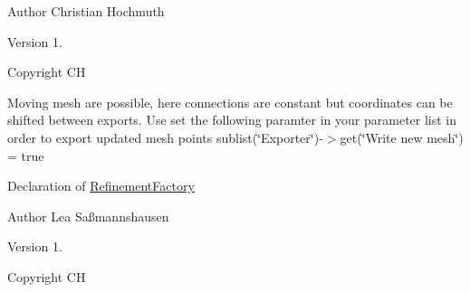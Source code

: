 \begin{DoxyAuthor}{Author}
Christian Hochmuth 
\end{DoxyAuthor}
\begin{DoxyVersion}{Version}
1. 
\end{DoxyVersion}
\begin{DoxyCopyright}{Copyright}
CH
\end{DoxyCopyright}
Moving mesh are possible, here connections are constant but coordinates can be shifted between exports. Use set the following paramter in your parameter list in order to export updated mesh points sublist(\char`\"{}\+Exporter\char`\"{})-\/$>$get(\char`\"{}\+Write new mesh\char`\"{}) = true

Declaration of \hyperlink{classFEDD_1_1RefinementFactory}{Refinement\+Factory}

\begin{DoxyAuthor}{Author}
Lea Saßmannshausen 
\end{DoxyAuthor}
\begin{DoxyVersion}{Version}
1. 
\end{DoxyVersion}
\begin{DoxyCopyright}{Copyright}
CH 
\end{DoxyCopyright}
